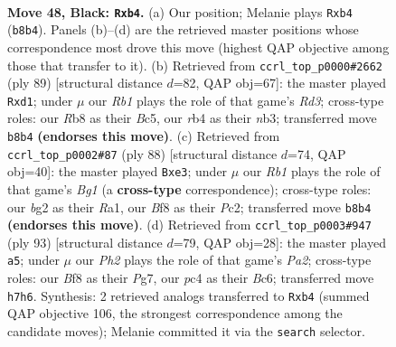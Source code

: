 \documentclass[11pt]{article}
\begin{document}
\clearpage

\begin{figure}[p]\centering
\begin{subfigure}{0.46\textwidth}\centering
\resizebox{\linewidth}{!}{%
\newchessgame
\chessboard[
  setfen={1r1r1b2/7p/p2pn1k1/P3p1Pp/1RP1P3/1P3PR1/2K3B1/4B3 b - - 0 48},
  showmover=false,
  pgfstyle=straightmove, color=movearrow, markmove={b8-b4}
]}
\caption{}
\end{subfigure}\hfill
\begin{subfigure}{0.46\textwidth}\centering
\resizebox{\linewidth}{!}{%
\newchessgame
\chessboard[
  setfen={8/8/pprr4/2b2p1p/P1n1k1pP/1NP1P1P1/4KP2/R2RB3 b - - 33 45},
  showmover=false,
  pgfstyle=straightmove, color=movearrow, markmove={d6-d1}
]}
\caption{}
\end{subfigure}
\\[4pt]
\begin{subfigure}{0.46\textwidth}\centering
\resizebox{\linewidth}{!}{%
\newchessgame
\chessboard[
  setfen={4rrn1/2p5/2k5/2p1P3/1p3p1p/4bN1P/1PP3P1/R4RBK w - - 0 45},
  showmover=false,
  pgfstyle=straightmove, color=movearrow, markmove={g1-e3}
]}
\caption{}
\end{subfigure}\hfill
\begin{subfigure}{0.46\textwidth}\centering
\resizebox{\linewidth}{!}{%
\newchessgame
\chessboard[
  setfen={6k1/p1r3p1/1pb1p2p/3n4/2rP2P1/P1N2P1P/1P3R1K/3RB3 b - - 0 47},
  showmover=false,
  pgfstyle=straightmove, color=movearrow, markmove={a7-a5}
]}
\caption{}
\end{subfigure}
\caption{\textbf{Move 48, Black: \texttt{Rxb4}.} (a) Our position; Melanie plays \texttt{Rxb4} (\texttt{b8b4}). Panels (b)--(d) are the retrieved master positions whose correspondence most drove this move (highest QAP objective among those that transfer to it). (b) Retrieved from \texttt{ccrl\_top\_p0000\#2662} (ply 89) [structural distance $d$=82, QAP obj=67]: the master played \texttt{Rxd1}; under $\mu$ our \emph{Rb1} plays the role of that game's \emph{Rd3}; cross-type roles: our \emph{R}b8 as their \emph{B}c5, our \emph{r}b4 as their \emph{n}b3; transferred move \texttt{b8b4} \textbf{(endorses this move)}. (c) Retrieved from \texttt{ccrl\_top\_p0002\#87} (ply 88) [structural distance $d$=74, QAP obj=40]: the master played \texttt{Bxe3}; under $\mu$ our \emph{Rb1} plays the role of that game's \emph{Bg1} (a \textbf{cross-type} correspondence); cross-type roles: our \emph{b}g2 as their \emph{R}a1, our \emph{B}f8 as their \emph{P}c2; transferred move \texttt{b8b4} \textbf{(endorses this move)}. (d) Retrieved from \texttt{ccrl\_top\_p0003\#947} (ply 93) [structural distance $d$=79, QAP obj=28]: the master played \texttt{a5}; under $\mu$ our \emph{Ph2} plays the role of that game's \emph{Pa2}; cross-type roles: our \emph{B}f8 as their \emph{P}g7, our \emph{p}c4 as their \emph{B}c6; transferred move \texttt{h7h6}. Synthesis: 2 retrieved analogs transferred to \texttt{Rxb4} (summed QAP objective 106, the strongest correspondence among the candidate moves); Melanie committed it via the \texttt{search} selector.}
\label{fig:thought-m95}
\end{figure}
\end{document}
